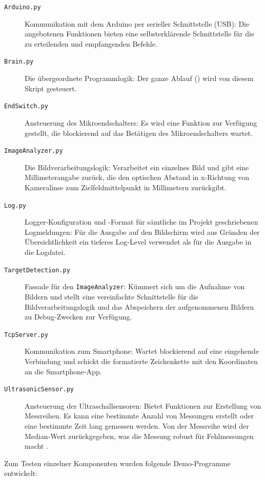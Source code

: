 \begin{description}
    \item[\texttt{Arduino.py}] Kommunikation mit dem Arduino per serieller Schnittstelle (USB): Die angebotenen Funktionen bieten eine selbsterklärende Schnittstelle für die zu erteilenden und empfangenden Befehle.
    \item[\texttt{Brain.py}] Die übergeordnete Programmlogik: Der ganze Ablauf () wird von diesem Skript gesteuert.
    \item[\texttt{EndSwitch.py}] Ansteuerung des Mikroendschalters: Es wird eine Funktion zur Verfügung gestellt, die blockierend auf das Betätigen des Mikroendschalters wartet.
    \item[\texttt{ImageAnalyzer.py}] Die Bildverarbeitungslogik: Verarbeitet ein einzelnes Bild und gibt eine Millimeterangabe zurück, die den optischen Abstand in x-Richtung von Kameralinse zum Zielfeldmittelpunkt in Millimetern zurückgibt.
    \item[\texttt{Log.py}] Logger-Konfiguration und -Format für sämtliche im Projekt geschriebenen Logmeldungen: Für die Ausgabe auf den Bildschirm wird aus Gründen der Übersichtlichkeit ein tieferes Log-Level verwendet als für die Ausgabe in die Logdatei.
    \item[\texttt{TargetDetection.py}] Fassade für den \texttt{ImageAnalyzer}: Kümmert sich um die Aufnahme von Bildern und stellt eine vereinfachte Schnittstelle für die Bildverarbeitungslogik und das Abspeichern der aufgenommenen Bildern zu Debug-Zwecken zur Verfügung.
    \item[\texttt{TcpServer.py}] Kommunikation zum Smartphone: Wartet blockierend auf eine eingehende Verbindung und schickt die formatierte Zeichenkette mit den Koordinaten an die Smartphone-App.
    \item[\texttt{UltrasonicSensor.py}] Ansteuerung der Ultraschallsensoren: Bietet Funktionen zur Erstellung von Messreihen. Es kann eine bestimmte Anzahl von Messungen erstellt oder eine bestimmte Zeit lang gemessen werden. Von der Messreihe wird der Median-Wert zurückgegeben, was die Messung robust für Fehlmessungen macht \cite[S. 46-48]{pren1}.
\end{description}

Zum Testen einzelner Komponenten wurden folgende Demo-Programme entwickelt:

